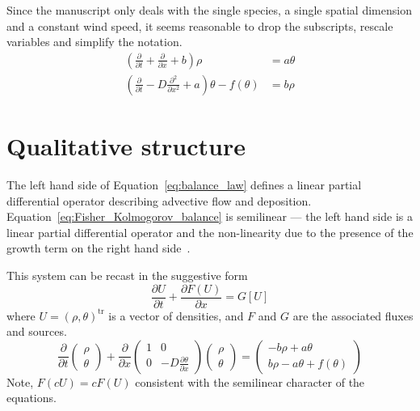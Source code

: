 \documentclass[12pt]{amsart}
\begin{document}
Since the manuscript only deals with the single species, a single
spatial dimension and a constant wind speed, it seems reasonable to
drop the subscripts, rescale variables and simplify the notation.
\begin{subequations}
\begin{align}
  \left(\frac{\partial}{\partial t} +
  \frac{\partial}{\partial x} +
  b\right)\rho &=
  a \theta \label{eq:balance_law}\\
  \left(\frac{\partial}{\partial t} - D\frac{\partial^2}{\partial x^2}+ a\right)\theta -
  f(\theta) & = b\rho \label{eq:Fisher_Kolmogorov_balance}
\end{align}
\end{subequations}

\section{Qualitative structure}

The left hand side of Equation~\ref{eq:balance_law} defines a
linear partial differential operator describing advective flow and
deposition.  Equation~\ref{eq:Fisher_Kolmogorov_balance} is
semilinear --- the left hand side is a linear partial differential
operator and the non-linearity due to the presence of the growth term 
on the right hand side~\cite{RozhdestvenskiiJanenko:1983}.

This system can be recast in the suggestive form
\begin{equation}
\frac{\partial U}{\partial t} + \frac{\partial F(U)}{\partial x} =
G\left[U\right]
\end{equation}
where $U = (\rho, \theta)^{\text{tr}}$ is a vector of densities, and
$F$ and $G$ are the associated fluxes and sources.
\begin{equation}
  \frac{\partial}{\partial t}
  \begin{pmatrix}
    \rho \\
    \theta
  \end{pmatrix}
  +
  \frac{\partial}{\partial x}
  \begin{pmatrix}
    1 & 0 \\
    0 & - D\frac{\partial\theta}{\partial x}
  \end{pmatrix}
  \begin{pmatrix}
    \rho \\
    \theta
  \end{pmatrix}
  =
  \begin{pmatrix}
    -b\rho + a\theta\\
    b\rho - a\theta + f(\theta)
  \end{pmatrix}
\end{equation}
Note, $F(cU) = cF(U)$ consistent with the semilinear character of the
equations.
\end{document}
